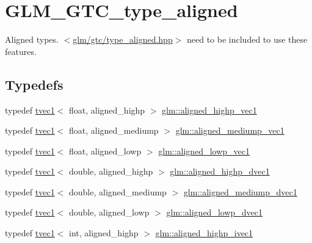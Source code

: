\hypertarget{group__gtc__type__aligned}{}\section{G\+L\+M\+\_\+\+G\+T\+C\+\_\+type\+\_\+aligned}
\label{group__gtc__type__aligned}


Aligned types. $<$\mbox{\hyperlink{gtc_2type__aligned_8hpp}{glm/gtc/type\+\_\+aligned.\+hpp}}$>$ need to be included to use these features.  


\subsection*{Typedefs}
\begin{DoxyCompactItemize}
\item 
typedef \mbox{\hyperlink{structglm_1_1tvec1}{tvec1}}$<$ float, aligned\+\_\+highp $>$ \mbox{\hyperlink{group__gtc__type__aligned_ga5d83af334bd222c85f73bf37eecf4768}{glm\+::aligned\+\_\+highp\+\_\+vec1}}
\item 
typedef \mbox{\hyperlink{structglm_1_1tvec1}{tvec1}}$<$ float, aligned\+\_\+mediump $>$ \mbox{\hyperlink{group__gtc__type__aligned_ga5fbb1e478f8f47c5809f561368572927}{glm\+::aligned\+\_\+mediump\+\_\+vec1}}
\item 
typedef \mbox{\hyperlink{structglm_1_1tvec1}{tvec1}}$<$ float, aligned\+\_\+lowp $>$ \mbox{\hyperlink{group__gtc__type__aligned_ga9f8de0030682199a8dbef56b0f3fb3ca}{glm\+::aligned\+\_\+lowp\+\_\+vec1}}
\item 
typedef \mbox{\hyperlink{structglm_1_1tvec1}{tvec1}}$<$ double, aligned\+\_\+highp $>$ \mbox{\hyperlink{group__gtc__type__aligned_ga14f56809d9577d7f1c3c8fc77651c671}{glm\+::aligned\+\_\+highp\+\_\+dvec1}}
\item 
typedef \mbox{\hyperlink{structglm_1_1tvec1}{tvec1}}$<$ double, aligned\+\_\+mediump $>$ \mbox{\hyperlink{group__gtc__type__aligned_gab12565fd290bac410edac30213fef31e}{glm\+::aligned\+\_\+mediump\+\_\+dvec1}}
\item 
typedef \mbox{\hyperlink{structglm_1_1tvec1}{tvec1}}$<$ double, aligned\+\_\+lowp $>$ \mbox{\hyperlink{group__gtc__type__aligned_gace9ca6ecc2dc6fe5891bb6d15bf3b317}{glm\+::aligned\+\_\+lowp\+\_\+dvec1}}
\item 
typedef \mbox{\hyperlink{structglm_1_1tvec1}{tvec1}}$<$ int, aligned\+\_\+highp $>$ \mbox{\hyperlink{group__gtc__type__aligned_gaebfad60737b3a3ec596dc0341ed538c3}{glm\+::aligned\+\_\+highp\+\_\+ivec1}}
\item 

\end{DoxyCompactItemize}
